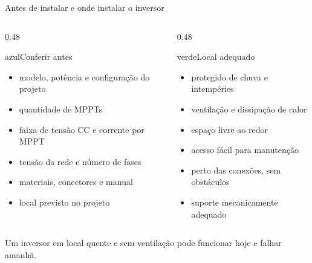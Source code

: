 \documentclass[aspectratio=169,10pt,xcolor=table]{beamer}
\newcommand{\frase}[1]{\vspace{0.1em}\begin{destaque}#1\end{destaque}}
\begin{document}
\begin{frame}{Antes de instalar e onde instalar o inversor}
  \begin{columns}[T]
    \begin{column}{0.48\textwidth}
      \begin{card}[equal height group=iv]{azul}{\faClipboardList\enspace Conferir antes}
        \begin{itemize}
          \item modelo, potência e configuração do projeto
          \item quantidade de MPPTs
          \item faixa de tensão CC e corrente por MPPT
          \item tensão da rede e número de fases
          \item materiais, conectores e manual
          \item local previsto no projeto
        \end{itemize}
      \end{card}
    \end{column}
    \begin{column}{0.48\textwidth}
      \begin{card}[equal height group=iv]{verde}{\faMapMarker*\enspace Local adequado}
        \begin{itemize}
          \item protegido de chuva e intempéries
          \item ventilação e dissipação de calor
          \item espaço livre ao redor
          \item acesso fácil para manutenção
          \item perto das conexões, sem obstáculos
          \item suporte mecanicamente adequado
        \end{itemize}
      \end{card}
    \end{column}
  \end{columns}
  \frase{Um inversor em local quente e sem ventilação pode funcionar hoje e falhar amanhã.}
\end{frame}
\end{document}
